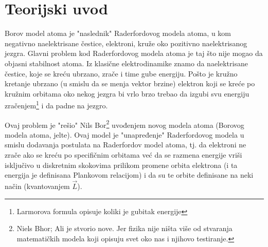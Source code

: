 \documentclass[12pt,a4paper]{article}
\begin{document}
\begin{titlepage}




 

\vfill %

\end{titlepage}


\renewcommand{\abstractname}{Rezime}
\renewcommand{\tablename}{Tabela}
\renewcommand{\figurename}{Slika}

\section*{Teorijski uvod}

Borov model atoma je "naslednik" Raderfordovog modela atoma, u kom negativno naelektrisane čestice, elektroni, kruže oko pozitivno naelektrisanog jezgra. Glavni problem kod Raderfordovog modela atoma je taj što nije mogao da objasni stabilnost atoma. Iz klasične elektrodinamike znamo da naelektrisane čestice, koje se kreću ubrzano, zrače i time gube energiju. Pošto je kružno kretanje ubrzano (u smislu da se menja vektor brzine) elektron koji se kreće po kružnim orbitama oko nekog jezgra bi vrlo brzo trebao da izgubi svu energiju zračenjem\footnote{Larmorova formula opisuje koliki je gubitak energije} i da padne na jezgro. 

Ovaj problem je "rešio" Nils Bor\footnote{Niels Bhor; Ali je stvorio nove. Jer fizika nije ništa više od stvaranja matematičkih modela koji opisuju svet oko nas i njihovo testiranje.} uvođenjem novog modela atoma (Borovog modela atoma, jelte). Ovaj model je "unapređenje" Raderfordovog modela u smislu dodavanja postulata na Raderfordov model atoma, tj. da elektroni ne zrače ako se kreću po specifičnim orbitama već da se razmena energije vriši isključivo u diskretnim skokovima prilikom promene orbita elektrona (i ta energija je definisana Plankovom relacijom) i da su te orbite definisane na neki način (kvantovanjem $\vec{L}$). 
\end{document}

